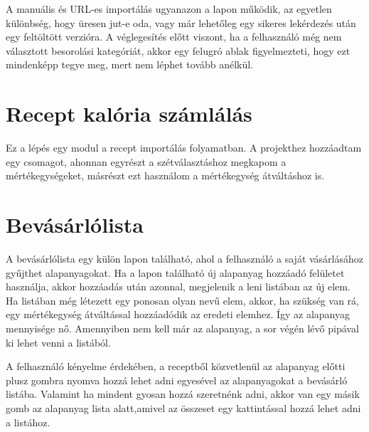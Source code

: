 \documentclass[12pt]{report}
\theoremstyle{definition}
\begin{document}
A manuális és URL-es importálás ugyanazon a lapon működik, az egyetlen különbség, hogy üresen jut-e oda, vagy már lehetőleg egy sikeres lekérdezés után egy feltöltött verzióra. A véglegesítés előtt viszont, ha a felhasználó még nem választott besorolási kategóriát, akkor egy felugró ablak figyelmezteti, hogy ezt mindenképp tegye meg, mert nem léphet tovább anélkül.

\section{Recept kalória számlálás}
Ez a lépés egy modul a recept importálás folyamatban. A projekthez hozzáadtam egy csomagot, ahonnan egyrészt a szétválasztáshoz megkapom a mértékegységeket, másrészt ezt használom a mértékegység átváltáshoz is.

{\color{red}{
  A tápanyag információkat egy külső adatbázisból szedem, ami offline és a gov.tt… weblapról szereztem. Az “About this website” menüpont alatt megjelenik a megfelelő kijelentés az adatbázis production használatáról.
}}

{\color{red}{
  A kalóriaszámlálás kizárólag akkor fut le, ha a receptlekérdezés során nem létezett az eredeti oldalon a kalória információ, vagy ha a recept manuálisan lett létrehozva. Ahhoz, hogy megfelelő eredményt kapjunk, ha az alapanyagokból nem tudunk legalább 80 százalékból tápanyag adatot megkapni, akkor nem lesz megjelenítve kalória információ a recepthez. Amennyiben megfelelő mennyiségű adatunk van, a korábban említett mértékegység átváltásokkal egységesítem az alapanyagokat a tápanyag táblázat alap értékéhez, aztán azt összeadva kapjuk a kalória adatot a recepthez.
  }}

\section{Bevásárlólista}
A bevásárlólista egy külön lapon található, ahol a felhasználó a saját vásárlásához gyűjthet alapanyagokat. Ha a lapon található új alapanyag hozzáadó felületet használja, akkor hozzáadás után azonnal, megjelenik a leni listában az új elem. Ha  listában még létezett egy ponosan olyan nevű elem, akkor, ha szükség van rá, egy mértékegység átváltással hozzáadódik az eredeti elemhez. Így az alapanyag mennyisége nő. Amennyiben nem kell már az alapanyag, a sor végén lévő pipával ki lehet venni a listából.

A felhasználó kényelme érdekében, a receptből közvetlenül az alapanyag előtti plusz gombra nyomva hozzá lehet adni egyesével az alapanyagokat a bevásárló listába. Valamint ha mindent gyosan hozzá szeretnénk adni, akkor van egy másik gomb az alapanyag lista alatt,amivel az összeset egy kattintással hozzá lehet adni a listához.
\end{document}
